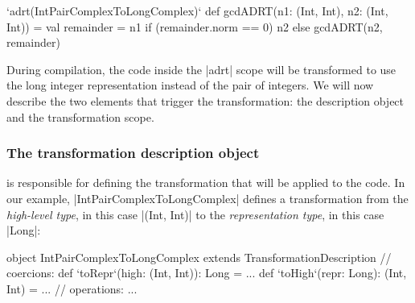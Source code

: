 \begin{lstlisting-nobreak}
`adrt(IntPairComplexToLongComplex)` {
  def gcdADRT(n1: (Int, Int), n2: (Int, Int)) = {
    val remainder = n1 %
    if (remainder.norm == 0) n2 else gcdADRT(n2, remainder)
  }
}
\end{lstlisting-nobreak}


During compilation, the code inside the |adrt| scope will be transformed to use the long integer representation instead of the pair of integers. We will now describe the two elements that trigger the transformation: the  description object and the transformation scope.

\subsubsection{The transformation description object} is responsible for defining the transformation that will be applied to the code. In our example, |IntPairComplexToLongComplex| defines a transformation from the \emph{high-level type}, in this case |(Int, Int)| to the \emph{representation type}, in this case |Long|:

\begin{lstlisting-nobreak}
object IntPairComplexToLongComplex
          extends TransformationDescription {
  // coercions:
  def `toRepr`(high: (Int, Int)): Long = ...
  def `toHigh`(repr: Long): (Int, Int) = ...
  // operations:
  ...
}
\end{lstlisting-nobreak}

